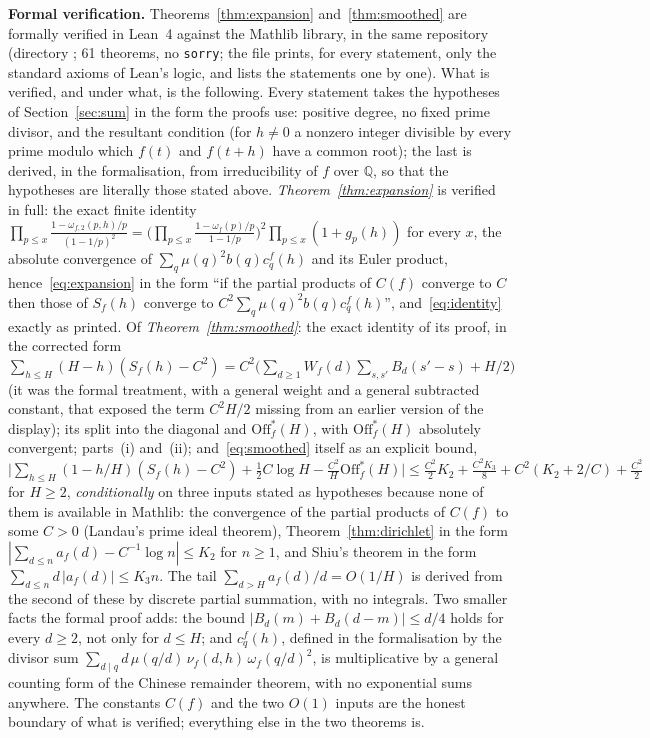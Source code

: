 \documentclass[11pt,a4paper]{article}
\theoremstyle{remark}\newtheorem{remark}[theorem]{Remark}
\newcommand{\Q}{\mathbb{Q}}
\begin{document}
\medskip\noindent\textbf{Formal verification.} Theorems~\ref{thm:expansion} and~\ref{thm:smoothed} are
formally verified in Lean~4 against the Mathlib library, in the same repository (directory
; 61 theorems, no \texttt{sorry}; the file 
prints, for every statement, only the standard axioms of Lean's logic, and  lists the
statements one by one). What is verified, and under what, is the following. Every statement takes the
hypotheses of Section~\ref{sec:sum} in the form the proofs use: positive degree, no fixed prime divisor,
and the resultant condition (for $h\ne0$ a nonzero integer divisible by every prime modulo which $f(t)$
and $f(t+h)$ have a common root); the last is derived, in the formalisation, from irreducibility of $f$
over $\Q$, so that the hypotheses are literally those stated above. \emph{Theorem~\ref{thm:expansion}} is
verified in full: the exact finite
identity $\prod_{p\le x}\frac{1-\omega_{f,2}(p,h)/p}{(1-1/p)^2}=\bigl(\prod_{p\le x}\frac{1-\omega_f(p)/p}{1-1/p}\bigr)^2
\prod_{p\le x}(1+g_p(h))$ for every $x$, the absolute convergence of $\sum_q\mu(q)^2b(q)c^f_q(h)$ and its
Euler product, hence~\eqref{eq:expansion} in the form ``if the partial products of $C(f)$ converge to $C$
then those of $S_f(h)$ converge to $C^2\sum_q\mu(q)^2b(q)c^f_q(h)$'', and~\eqref{eq:identity} exactly as
printed. Of \emph{Theorem~\ref{thm:smoothed}}: the exact identity of its proof, in the corrected form
$\sum_{h\le H}(H-h)(S_f(h)-C^2)=C^2\bigl(\sum_{d\ge1}W_f(d)\sum_{s,s'}B_d(s'-s)+H/2\bigr)$ (it was the
formal treatment, with a general weight and a general subtracted constant, that exposed the term $C^2H/2$
missing from an earlier version of the display); its split into the diagonal and $\mathrm{Off}^\ast_f(H)$,
with $\mathrm{Off}^\ast_f(H)$ absolutely convergent; parts~(i) and~(ii); and~\eqref{eq:smoothed} itself as an
explicit bound, $\bigl|\sum_{h\le H}(1-h/H)(S_f(h)-C^2)+\tfrac12C\log H-\tfrac{C^2}H\mathrm{Off}^\ast_f(H)\bigr|
\le\tfrac{C^2}2K_2+\tfrac{C^2K_3}8+C^2(K_2+2/C)+\tfrac{C^2}2$ for $H\ge2$, \emph{conditionally} on three
inputs stated as hypotheses because none of them is available in Mathlib: the convergence of the partial
products of $C(f)$ to some $C>0$ (Landau's prime ideal theorem), Theorem~\ref{thm:dirichlet} in the form
$|\sum_{d\le n}a_f(d)-C^{-1}\log n|\le K_2$ for $n\ge1$, and Shiu's theorem in the form
$\sum_{d\le n}d\,|a_f(d)|\le K_3n$. The tail $\sum_{d>H}a_f(d)/d=O(1/H)$ is derived from the second of
these by discrete partial summation, with no integrals. Two smaller facts the formal proof adds: the bound
$|B_d(m)+B_d(d-m)|\le d/4$ holds for every $d\ge2$, not only for $d\le H$; and $c^f_q(h)$, defined in the
formalisation by the divisor sum $\sum_{d\mid q}d\,\mu(q/d)\,\nu_f(d,h)\,\omega_f(q/d)^2$, is multiplicative
by a general counting form of the Chinese remainder theorem, with no exponential sums anywhere. The
constants $C(f)$ and the two $O(1)$ inputs are the honest boundary of what is verified; everything
else in the two theorems is.
\end{document}
